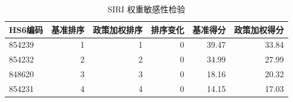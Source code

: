\begin{table}[H]
\centering
\caption{SIRI 权重敏感性检验}
\label{tab:siri-sensitivity}
\begin{tabular}{lrrrrr}
\toprule
HS6编码 & 基准排序 & 政策加权排序 & 排序变化 & 基准得分 & 政策加权得分 \\
\midrule
854239 & 1 & 1 & 0 & 39.47 & 33.84 \\
854232 & 2 & 2 & 0 & 34.99 & 27.99 \\
848620 & 3 & 3 & 0 & 18.16 & 20.32 \\
854231 & 4 & 4 & 0 & 14.15 & 17.03 \\
\bottomrule
\end{tabular}
\end{table}
